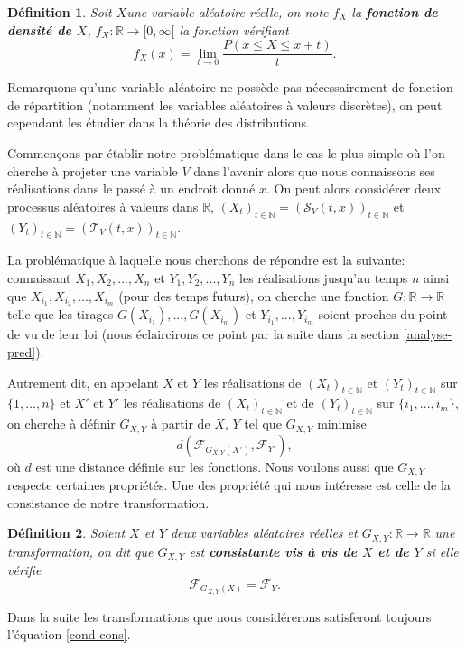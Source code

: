 \documentclass[a4paper,11pt]{article}
\newtheorem{definition}{Définition}
\begin{document}
\begin{definition}
	Soit $X$une variable aléatoire réelle, on note $f_{X}$ la \textbf{fonction de densité de $X$}, $f_{X}: \mathbb{R}\to [0,\infty[$ la fonction vérifiant
	\begin{equation}
		f_{X}(x)=\lim_{t\to 0} \frac{P(x\leq X \leq x+t)}{t}.
	\end{equation}
\end{definition}
Remarquons qu'une variable aléatoire ne possède pas nécessairement de fonction de répartition (notamment les variables aléatoires à valeurs discrètes), on peut cependant les étudier dans la théorie des distributions.


Commençons par établir notre problématique dans le cas le plus simple où l'on cherche à projeter une variable $V$ dans l'avenir alors que nous connaissons ses réalisations dans le passé à un endroit donné $x$.
On peut alors considérer deux processus aléatoires à valeurs dans $\mathbb{R}$, $(X_t)_{t \in \mathbb{N}}=(\mathcal{S}_{V}(t, x))_{t \in \mathbb{N}}$ et $(Y_t)_{t \in \mathbb{N}}=(\mathcal{T}_{V}(t, x))_{t \in \mathbb{N}}$.

La problématique à laquelle nous cherchons de répondre est la suivante: connaissant $X_1,X_2,...,X_n$ et $Y_1,Y_2,...,Y_n$ les réalisations jusqu'au temps $n$ ainsi que $X_{i_1},X_{i_2},...,X_{i_m}$ (pour des temps futurs), on cherche une fonction $G: \mathbb{R} \to \mathbb{R}$ telle que les tirages $G(X_{i_1}),..., G(X_{i_m})$ et $Y_{i_1},...,Y_{i_m}$ soient proches du point de vu de leur loi (nous éclaircirons ce point par la suite dans la section \ref{analyse-pred}). 

Autrement dit, en appelant $X$ et $Y$ les réalisations de $(X_t)_{t \in \mathbb{N}}$ et $(Y_t)_{t \in \mathbb{N}}$ sur $\{1,...,n\}$ et $X'$ et $Y'$ les réalisations de $(X_t)_{t \in \mathbb{N}}$ et de $(Y_t)_{t \in \mathbb{N}}$ sur $\{i_1,...,i_m\}$, on cherche à définir $G_{X,Y}$ à partir de $X$, $Y$ tel que $G_{X,Y}$ minimise 
\[d(\mathcal{F}_{G_{X,Y}(X')}, \mathcal{F}_{Y'}),\]
où $d$ est une distance définie sur les fonctions.
Nous voulons aussi que $G_{X,Y}$ respecte certaines propriétés. Une des propriété qui nous intéresse est celle de la consistance de notre transformation.

\begin{definition}
	Soient $X$ et $Y$ deux variables aléatoires réelles et $G_{X,Y}: \mathbb{R}\to \mathbb{R}$ une transformation, on dit que $G_{X,Y}$ est \textbf{consistante vis à vis de $X$ et de $Y$} si elle vérifie 
\begin{equation}
	\label{cond-cons}
	{\mathcal{F}_{G_{X,Y}(X)}}= \mathcal{F}_{Y}.
\end{equation}
\end{definition}
Dans la suite les transformations que nous considérerons satisferont toujours l'équation \eqref{cond-cons}.
\end{document}
